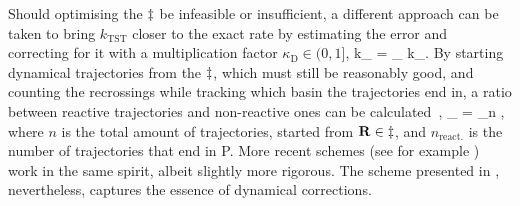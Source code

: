 
Should optimising the $\ddagger$ be infeasible or insufficient, a different approach can be taken to bring $k_\text{TST}$ closer to the exact rate by estimating the error and correcting for it with a multiplication factor $\kappa_\text{D} \in (0, 1]$,
k_ = \kappa_ \text{ } k_.
\eeq
By starting dynamical trajectories from the $\ddagger$, which must still be reasonably good, and counting the recrossings while tracking which basin the trajectories end in, a ratio between reactive trajectories and non-reactive ones can be calculated~\cite{dynamical-corrections-keck-1962},
\kappa_ = \lim_{n \rightarrow \infty} ,
\eeq
where $n$ is the total amount of trajectories, started from ${\mathrm{\mathbf{\bm{R}}}} \in \ddagger$, and $n_\text{react.}$ is the number of trajectories that end in P.
More recent schemes (see for example \cite{vtst-2005, dynamical-corrections-chandler-1977, dynamical-corrections-bennett-1977}) work in the same spirit, albeit slightly more rigorous.
The scheme presented in , nevertheless, captures the essence of dynamical corrections.
